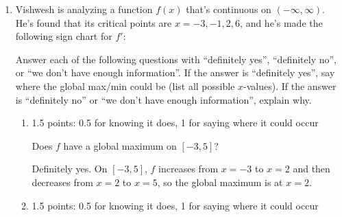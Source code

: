 \documentclass{article}
\begin{document}
\begin{enumerate}
\item  

  Vishwesh is analyzing a function $f(x)$ that's continuous on $(-\infty, \infty)$. He's found that its critical points are $x = -3, -1, 2, 6$, and he's made the following sign chart for $f'$:
  \begin{center}
  \end{center}

  Answer each of the following questions with ``definitely yes'', ``definitely no'', or ``we don't have enough information''. If the answer is ``definitely yes'', say where the global max/min could be (list all possible $x$-values). If the answer is ``definitely no'' or ``we don't have enough information'', explain why. 

  \begin{enumerate}
  \item

    \begin{grading}
      1.5 points: 0.5 for knowing it does, 1 for saying where it could occur
    \end{grading}

    \begin{problem}[\vfill]
      Does $f$ have a global maximum on $[-3, 5]$? 
    \end{problem}

    \begin{solution}
      Definitely yes. On $[-3, 5]$, $f$ increases from $x=-3$ to $x=2$ and
      then decreases from $x=2$ to $x=5$, so the global maximum is at $x=2$. 
    \end{solution}

  \item

    \begin{grading}
      1.5 points: 0.5 for knowing it does, 1 for saying where it could occur
    \end{grading}


\end{enumerate}
\end{enumerate}
\end{document}

